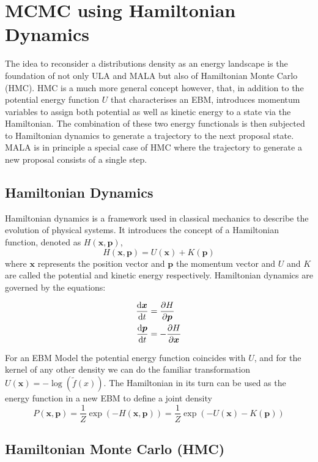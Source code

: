 
\section{MCMC using Hamiltonian Dynamics}

The idea to reconsider a distributions density as an energy landscape is the foundation of not only ULA and MALA but also of Hamiltonian Monte Carlo (HMC).
HMC is a much more general concept however, that, in addition to the potential energy function $U$ that characterises an EBM, 
introduces momentum variables to assign both potential as well as kinetic energy to a state via the Hamiltonian.
The combination of these two energy functionals is then subjected to Hamiltonian dynamics to generate a trajectory to the next proposal state.
MALA is in principle a special case of HMC where the trajectory to generate a new proposal consists of a single step.

\subsection{ Hamiltonian Dynamics }
Hamiltonian dynamics is a framework used in classical mechanics to describe the evolution of physical systems. 
It introduces the concept of a Hamiltonian function, denoted as $H(\bm{x}, \bm{p})$,
\[
	H(\bm{x}, \bm{p}) = U(\bm{x}) + K(\bm{p})
\]
where $\bm{x}$ represents the position vector and $\bm{p}$ the momentum vector and $U$ and $K$ are called the potential and kinetic energy respectively.
Hamiltonian dynamics are governed by the equations:

\[
\begin{aligned}
	\frac{\mathop{}\!\mathrm{d} \bm{x}}{\mathop{}\!\mathrm{d} t} &= \frac{\partial H}{\partial \bm{p}} \\
	\frac{\mathop{}\!\mathrm{d} \bm{p}}{\mathop{}\!\mathrm{d} t} &= -\frac{\partial H}{\partial \bm{x}} \\
\end{aligned}
\]

For an EBM Model the potential energy function coincides with $U$, 
and for the kernel of any other density we can do the familiar transformation $U(\bm{x}) = - \log(\tilde{f}(x))$.
The Hamiltonian in its turn can be used as the energy function in a new EBM to define a joint density
\[
	P(\bm{x}, \bm{p}) = \frac{1}{Z} \exp( - H(\bm{x}, \bm{p}) ) = \frac{1}{Z} \exp( - U(\bm{x}) - K(\bm{p}) )
\]


\subsection{Hamiltonian Monte Carlo (HMC)}

